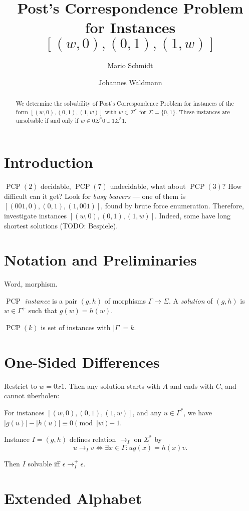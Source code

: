 \documentclass{llncs}
\author{Mario Schmidt \inst{1}
  \and 
  Johannes Waldmann \inst{2}
}
\institute{
  Universit\"at Leipzig
  \and
  HTWK Leipzig
}
\title{Post's Correspondence Problem \\
  for Instances $[(w,0),(0,1),(1,w)]$
}
\newcommand{\PCP}{\operatorname{PCP}}
\begin{document}
\maketitle

\begin{abstract}
  We determine the solvability of Post's Correspondence Problem
  for instances of the form  $[(w,0),(0,1),(1,w)]$ 
  with $w \in\Sigma^*$ for $\Sigma= \{0,1\}$.
  These instances are unsolvable 
  if and only if $w \in 0 \Sigma^* 0 \cup 1 \Sigma^* 1$.
\end{abstract}

\section{Introduction}

$\PCP(2)$ decidable, $\PCP(7)$ undecidable, what about $\PCP(3)$?
How difficult can it get? Look for \emph{busy beavers} ---
one of them is $[(001,0),(0,1),(1,001)]$, found by brute force enumeration.
Therefore, investigate instances  $[(w,0),(0,1),(1,w)]$.
Indeed, some have long shortest solutions (TODO: Bespiele).

\section{Notation and Preliminaries}

Word, morphism. 

$\PCP$ \emph{instance} is a pair $(g,h)$ of morphisms $\Gamma\to\Sigma$.
A \emph{solution} of  $(g,h)$ is $w\in\Gamma^+$ such that $g(w)=h(w)$.

$\PCP(k)$ is set of instances with $|\Gamma|=k$.

\section{One-Sided Differences}

Restrict to $w = 0x1$. Then any solution starts with $A$ and ends with $C$,
and cannot \"uberholen:

For instances  $[(w,0),(0,1),(1,w)]$,
and any $u\in\Gamma^*$, we have $|g(u)| - |h(u)| \equiv 0 \pmod |w|-1$.

Instance $I=(g,h)$ defines relation $\to_I$ on $\Sigma^*$ by
\[
   u \to_I v \iff \exists x\in\Gamma: u g(x) = h(x) v.
\]

Then $I$ solvable iff $\epsilon \to_I^+ \epsilon$.


\section{Extended Alphabet}
\end{document}
